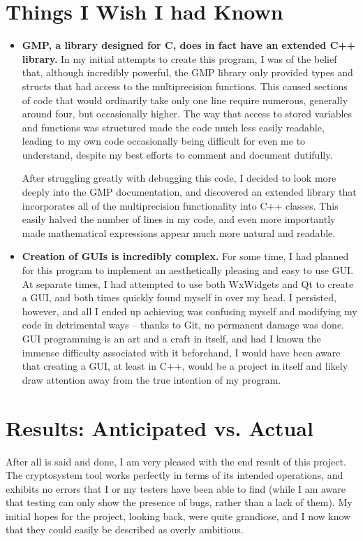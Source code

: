 \documentclass[11pt]{article}
\begin{document}
\section{Things I Wish I had Known}
\begin{itemize}
\item
{
\textbf{GMP, a library designed for C, does in fact have an extended C++ library.} In my initial attempts to create this program, I was of the belief that, although incredibly powerful, the GMP library only provided types and structs that had access to the multiprecision functions. This caused sections of code that would ordinarily take only one line require numerous, generally around four, but occasionally higher. The way that access to stored variables and functions was structured made the code much less easily readable, leading to my own code occasionally being difficult for even me to understand, despite my best efforts to comment and document dutifully.

After struggling greatly with debugging this code, I decided to look more deeply into the GMP documentation, and discovered an extended library that incorporates all of the multiprecision functionality into C++ classes. This easily halved the number of lines in my code, and even more importantly made mathematical expressions appear much more natural and readable.
}

\item
{
\textbf{Creation of GUIs is incredibly complex.} For some time, I had planned for this program to implement an aesthetically pleasing and easy to use GUI. At separate times, I had attempted to use both WxWidgets and Qt to create a GUI, and both times quickly found myself in over my head. I persisted, however, and all I ended up achieving was confusing myself and modifying my code in detrimental ways -- thanks to Git, no permanent damage was done. GUI programming is an art and a craft in itself, and had I known the immense difficulty associated with it beforehand, I would have been aware that creating a GUI, at least in C++, would be a project in itself and likely draw attention away from the true intention of my program.
}
\end{itemize}

\section{Results: Anticipated vs. Actual}
After all is said and done, I am very pleased with the end result of this project. The cryptosystem tool works perfectly in terms of its intended operations, and exhibits no errors that I or my testers have been able to find (while I am aware that testing can only show the presence of bugs, rather than a lack of them). My initial hopes for the project, looking back, were quite grandiose, and I now know that they could easily be described as overly ambitious. 
\end{document}
